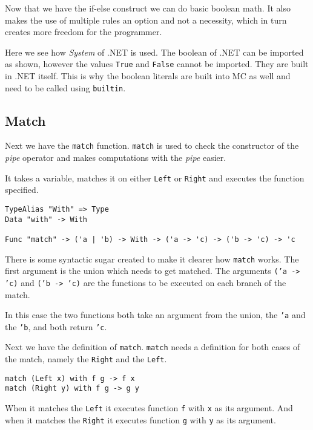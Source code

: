 Now that we have the if-else construct we can do basic boolean math.
It also makes the use of multiple rules an option and not a necessity, which in turn creates more freedom for the programmer.

Here we see how \emph{System} of .NET is used.
The boolean of .NET can be imported as shown, however the values \texttt{True} and \texttt{False} cannot be imported.
They are built in .NET itself.
This is why the boolean literals are built into MC as well and need to be called using \texttt{builtin}.


\subsection{Match}
Next we have the \texttt{match} function.
\texttt{match} is used to check the constructor of the \emph{pipe} operator and makes computations with the \emph{pipe} easier.

It takes a variable, matches it on either \verb|Left| or \verb|Right| and executes the function specified.

\begin{lstlisting}
TypeAlias "With" => Type
Data "with" -> With

Func "match" -> ('a | 'b) -> With -> ('a -> 'c) -> ('b -> 'c) -> 'c
\end{lstlisting}

There is some syntactic sugar created to make it clearer how \texttt{match} works.
The first argument is the union which needs to get matched.
The arguments \texttt{('a -> 'c)} and \texttt{('b -> 'c)} are the functions to be executed on each
\newline branch of the match.

In this case the two functions both take an argument from the union, the \texttt{'a} and the \texttt{'b}, and both return \texttt{'c}.

Next we have the definition of \texttt{match}.
\texttt{match} needs a definition for both cases of the match, namely the \texttt{Right} and the \texttt{Left}.

\begin{lstlisting}
match (Left x) with f g -> f x
match (Right y) with f g -> g y
\end{lstlisting}

When it matches the \texttt{Left} it executes function \texttt{f} with \texttt{x} as its argument.
And when it matches the \texttt{Right} it executes function \texttt{g} with \texttt{y} as its argument.

